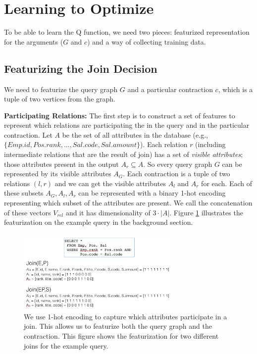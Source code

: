 \section{Learning to Optimize}
To be able to learn the Q function, we need two pieces: featurized representation for the arguments ($G$ and $c$) and a way of collecting training data.

\subsection{Featurizing the Join Decision}
We need to featurize the query graph $G$ and a particular contraction $c$, which is a tuple of two vertices from the graph. 

\vspace{0.5em} \noindent \textbf{Participating Relations: } The first step is to construct a set of features to represent which relations are participating the in the query and in the particular contraction. Let $A$ be the set of all attributes in the database (e.g., $ \{Emp.id, Pos.rank,...,Sal.code,Sal.amount\}$). Each relation $r$ (including intermediate relations that are the result of join) has a set of \emph{visible attributes}; those attributes present in the output $A_r \subseteq A$. So every query graph $G$ can be represented by its visible attributes $A_G$. Each contraction is a tuple of two relations $(l,r)$ and we can get the visible attributes $A_l$ and $A_r$ for each. Each of these subsets $A_G, A_l, A_r$ can be represented with a binary 1-hot encoding representing which subset of the attributes are present. We call the concatenation of these vectors $V_{rel}$ and it has dimensionality of $3\cdot|A|$. Figure \ref{feat} illustrates the featurization on the example query in the background section. 

\begin{figure}
    \centering
    \includegraphics[width=0.7\textwidth]{figs/featurization.png}
    \caption{We use 1-hot encoding to capture which attributes participate in a join. This allows us to featurize both the query graph and the contraction. This figure shows the featurization for two different joins for the example query. \label{feat}}
\end{figure}

